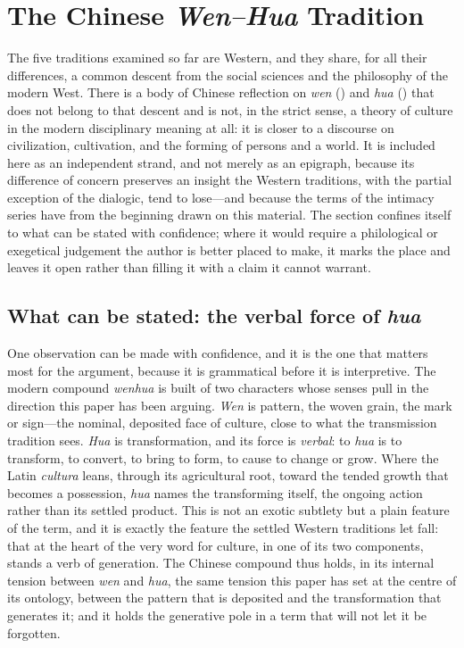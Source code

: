\section{The Chinese \emph{Wen--Hua} Tradition}
\label{p24:sec:chinese}

\noindent
The five traditions examined so far are Western, and they share, for all their differences, a common descent from the social sciences and the philosophy of the modern West. There is a body of Chinese reflection on \emph{wen} () and \emph{hua} () that does not belong to that descent and is not, in the strict sense, a theory of culture in the modern disciplinary meaning at all: it is closer to a discourse on civilization, cultivation, and the forming of persons and a world. It is included here as an independent strand, and not merely as an epigraph, because its difference of concern preserves an insight the Western traditions, with the partial exception of the dialogic, tend to lose---and because the terms of the intimacy series have from the beginning drawn on this material. The section confines itself to what can be stated with confidence; where it would require a philological or exegetical judgement the author is better placed to make, it marks the place and leaves it open rather than filling it with a claim it cannot warrant.

\subsection*{What can be stated: the verbal force of \emph{hua}}

One observation can be made with confidence, and it is the one that matters most for the argument, because it is grammatical before it is interpretive. The modern compound \emph{wenhua} is built of two characters whose senses pull in the direction this paper has been arguing. \emph{Wen} is pattern, the woven grain, the mark or sign---the nominal, deposited face of culture, close to what the transmission tradition sees. \emph{Hua} is transformation, and its force is \emph{verbal}: to \emph{hua} is to transform, to convert, to bring to form, to cause to change or grow. Where the Latin \emph{cultura} leans, through its agricultural root, toward the tended growth that becomes a possession, \emph{hua} names the transforming itself, the ongoing action rather than its settled product. This is not an exotic subtlety but a plain feature of the term, and it is exactly the feature the settled Western traditions let fall: that at the heart of the very word for culture, in one of its two components, stands a verb of generation. The Chinese compound thus holds, in its internal tension between \emph{wen} and \emph{hua}, the same tension this paper has set at the centre of its ontology, between the pattern that is deposited and the transformation that generates it; and it holds the generative pole in a term that will not let it be forgotten.

